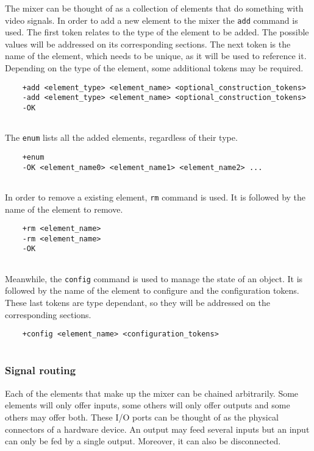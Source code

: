 \documentclass[../main.tex]{subfiles}
\begin{document}
The mixer can be thought of as a collection of elements that do something with video signals. In order to add a new element to the mixer the \texttt{add} command is used. The first token relates to the type of the element to be added. The possible values will be addressed on its corresponding sections. The next token is the name of the element, which needs to be unique, as it will be used to reference it. Depending on the type of the element, some additional tokens may be required.

\begin{lstlisting}
    +add <element_type> <element_name> <optional_construction_tokens>
    -add <element_type> <element_name> <optional_construction_tokens>
    -OK
    
\end{lstlisting}

The \texttt{enum} lists all the added elements, regardless of their type.
\begin{lstlisting}
    +enum
    -OK <element_name0> <element_name1> <element_name2> ...
    
\end{lstlisting}

In order to remove a existing element, \texttt{rm} command is used. It is followed by the name of the element to remove.

\begin{lstlisting}
    +rm <element_name>
    -rm <element_name>
    -OK
    
\end{lstlisting}

Meanwhile, the \texttt{config} command is used to manage the state of an object. It is followed by the name of the element to configure and the configuration tokens. These last tokens are type dependant, so they will be addressed on the corresponding sections.

\begin{lstlisting}
    +config <element_name> <configuration_tokens>
    
\end{lstlisting}


\subsubsection{Signal routing}

Each of the elements that make up the mixer can be chained arbitrarily. Some elements will only offer inputs, some others will only offer outputs and some others may offer both. These I/O ports can be thought of as the physical connectors of a hardware device. An output may feed several inputs but an input can only be fed by a single output. Moreover, it can also be disconnected.\newline
\end{document}
